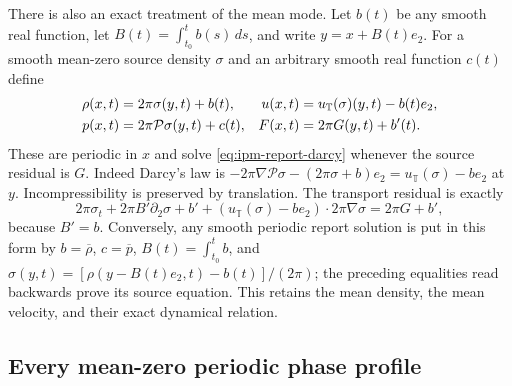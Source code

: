 There is also an exact treatment of the mean mode. Let $b(t)$ be any smooth
real function, let $B(t)=\int_{t_0}^t b(s)\,ds$, and write
$y=x+B(t)e_2$. For a smooth mean-zero source density $\sigma$ and an arbitrary
smooth real function $c(t)$ define
\begin{align}\label{eq:ipm-mean-dynamical-map}
 \rho(x,t)&=2\pi\sigma(y,t)+b(t),&
 u(x,t)&=u_{\mathbb T}(\sigma)(y,t)-b(t)e_2,\\
 p(x,t)&=2\pi\mathcal P\sigma(y,t)+c(t),&
 F(x,t)&=2\pi G(y,t)+b'(t).\notag
\end{align}
These are periodic in $x$ and solve \eqref{eq:ipm-report-darcy} whenever the
source residual is $G$. Indeed Darcy's law is
$-2\pi\nabla\mathcal P\sigma-(2\pi\sigma+b)e_2
=u_{\mathbb T}(\sigma)-be_2$ at $y$. Incompressibility is preserved by
translation. The transport residual is exactly
\[
 2\pi\sigma_t+2\pi B'\partial_2\sigma+b'
 +(u_{\mathbb T}(\sigma)-be_2)\cdot2\pi\nabla\sigma
 =2\pi G+b',
\]
because $B'=b$. Conversely, any smooth periodic report solution is put in
this form by $b=\overline\rho$, $c=\overline p$, $B(t)=\int_{t_0}^t b$, and
$\sigma(y,t)=[\rho(y-B(t)e_2,t)-b(t)]/(2\pi)$; the preceding equalities
read backwards prove its source equation. This retains the mean density,
the mean velocity, and their exact dynamical relation.

\subsection{Every mean-zero periodic phase profile}

